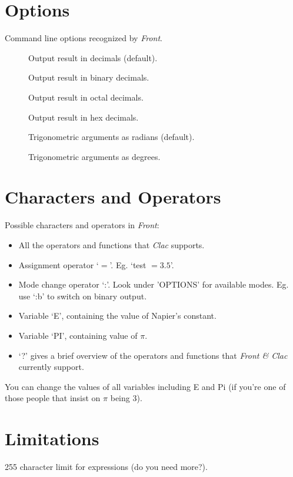 \section{Options}

	Command line options recognized by {\sl Front}.
	\begin{description}
	\item[]	Output result in decimals (default).
	\item[]	Output result in binary decimals.
	\item[]	Output result in octal decimals.
	\item[]	Output result in hex decimals.
	\item[]	Trigonometric arguments as radians (default).
	\item[]	Trigonometric arguments as degrees.
	\end{description}


\section{Characters and Operators}

	Possible characters and operators in {\sl Front\/}:
	\begin{itemize}
	\item	All the operators and functions that {\sl Clac\/} supports.
	\item	Assignment operator `$=$'. Eg. `test $= 3.5$'.
	\item	Mode change operator `:'. Look under 'OPTIONS' for
		available modes. Eg. use `:b' to switch on binary output.
	\item	Variable `E', containing the value of Napier's constant.
	\item	Variable `PI', containing value of $ \pi $.
	\item	`?' gives a brief overview of the operators and
		functions that {\sl Front \& Clac\/} currently support.
	\end{itemize}

	You can change the values of all variables including E and Pi
	(if you're one of those people that insist on $ \pi $ being 3).


\section{Limitations}

	255 character limit for expressions (do you need more?).


